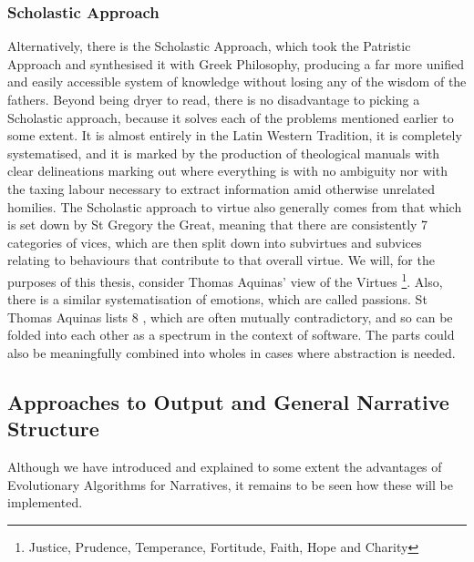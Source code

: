 \documentclass[12pt]{article}
\begin{document}
\subsubsection{Scholastic Approach} 
Alternatively, there is the Scholastic Approach, which took the Patristic Approach and synthesised it with Greek Philosophy, producing a far more unified and easily accessible system of knowledge without losing any of the wisdom of the fathers. Beyond being dryer to read, there is no disadvantage to picking a Scholastic approach, because it solves each of the problems mentioned earlier to some extent. It is almost entirely in the Latin Western Tradition, it is completely systematised, and it is marked by the production of theological manuals with clear delineations marking out where everything is with no ambiguity nor with the taxing labour necessary to extract information amid otherwise unrelated homilies. The Scholastic approach to virtue also generally comes from that which is set down by St Gregory the Great, meaning that there are consistently 7 categories of vices, which are then split down into subvirtues and subvices relating to behaviours that contribute to that overall virtue. We will, for the purposes of this thesis, consider Thomas Aquinas' view of the Virtues \footnote{Justice, Prudence, Temperance, Fortitude, Faith, Hope and Charity}. Also, there is a similar systematisation of emotions, which are called passions. St Thomas Aquinas lists 8 \cite{ThomasAq85:online}, which are often mutually contradictory, and so can be folded into each other as a spectrum in the context of software. The parts could also be meaningfully combined into wholes in cases where abstraction is needed.\\
\subsection{Approaches to Output and General Narrative Structure}
Although we have introduced and explained to some extent the advantages of Evolutionary Algorithms for Narratives, it remains to be seen how these will be implemented. 
\end{document}
